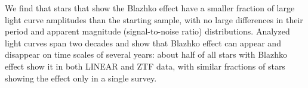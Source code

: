 

We find that stars that show the Blazhko effect have a smaller fraction of
large light curve amplitudes than the starting sample, with no large differences in their period and apparent
magnitude (signal-to-noise ratio) distributions. Analyzed light curves span two decades and show that Blazhko
effect can appear and disappear on time scales of several years: about half of all stars with Blazhko effect show
it in both LINEAR and ZTF data, with similar fractions of stars showing the effect only in a single survey.


